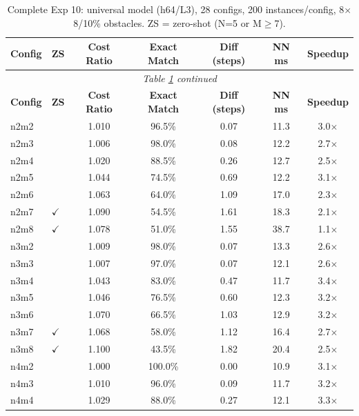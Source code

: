 \documentclass[11pt,a4paper]{article}
\begin{document}
\begin{longtable}{llccccc}
\caption{Complete Exp 10: universal model (h64/L3), 28 configs, 200 instances/config,
8$\times$8/10\% obstacles. ZS = zero-shot (N=5 or M$\geq$7).}
\label{tab:fullpipe10} \\
\toprule
\textbf{Config} & \textbf{ZS} & \textbf{Cost Ratio} & \textbf{Exact Match} &
  \textbf{Diff (steps)} & \textbf{NN ms} & \textbf{Speedup} \\
\midrule
\endfirsthead
\multicolumn{7}{c}{\small\textit{Table \ref{tab:fullpipe10} continued}} \\[4pt]
\toprule
\textbf{Config} & \textbf{ZS} & \textbf{Cost Ratio} & \textbf{Exact Match} &
  \textbf{Diff (steps)} & \textbf{NN ms} & \textbf{Speedup} \\
\midrule
\endhead
\bottomrule
\endfoot
n2m2 &              & 1.010 & 96.5\% & 0.07 & 11.3 & 3.0$\times$ \\
n2m3 &              & 1.006 & 98.0\% & 0.08 & 12.2 & 2.7$\times$ \\
n2m4 &              & 1.020 & 88.5\% & 0.26 & 12.7 & 2.5$\times$ \\
n2m5 &              & 1.044 & 74.5\% & 0.69 & 12.2 & 3.1$\times$ \\
n2m6 &              & 1.063 & 64.0\% & 1.09 & 17.0 & 2.3$\times$ \\
n2m7 & $\checkmark$ & 1.090 & 54.5\% & 1.61 & 18.3 & 2.1$\times$ \\
n2m8 & $\checkmark$ & 1.078 & 51.0\% & 1.55 & 38.7 & 1.1$\times$ \\
n3m2 &              & 1.009 & 98.0\% & 0.07 & 13.3 & 2.6$\times$ \\
n3m3 &              & 1.007 & 97.0\% & 0.07 & 12.1 & 2.6$\times$ \\
n3m4 &              & 1.043 & 83.0\% & 0.47 & 11.7 & 3.4$\times$ \\
n3m5 &              & 1.046 & 76.5\% & 0.60 & 12.3 & 3.2$\times$ \\
n3m6 &              & 1.070 & 66.5\% & 1.03 & 12.9 & 3.2$\times$ \\
n3m7 & $\checkmark$ & 1.068 & 58.0\% & 1.12 & 16.4 & 2.7$\times$ \\
n3m8 & $\checkmark$ & 1.100 & 43.5\% & 1.82 & 20.4 & 2.5$\times$ \\
n4m2 &              & 1.000 & 100.0\% & 0.00 & 10.9 & 3.1$\times$ \\
n4m3 &              & 1.010 & 96.0\% & 0.09 & 11.7 & 3.2$\times$ \\
n4m4 &              & 1.029 & 88.0\% & 0.27 & 12.1 & 3.3$\times$ \\

\end{longtable}
\end{document}
